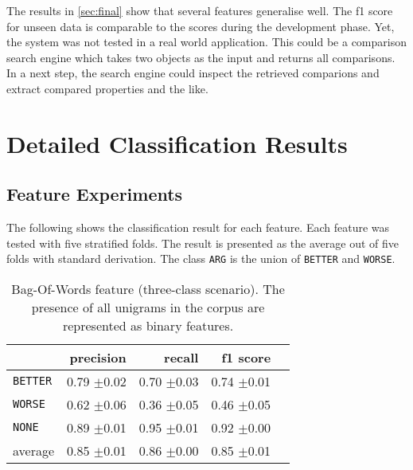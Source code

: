 The results in \ref{sec:final} show that several features generalise well. The f1 score for unseen data is comparable to the scores during the development phase. Yet, the system was not tested in a real world application. This could be a comparison search engine which takes two objects as the input and returns all comparisons. In a next step, the search engine could inspect the retrieved comparions and extract compared properties and the like.

\appendix

	\chapter{Detailed Classification Results}
\section{Feature Experiments}
	\setcounter{section}{1}
	The following shows the classification result for each feature. Each feature was tested with five stratified folds. The result is presented as the average out of five folds with standard derivation. The class \texttt{ARG} is the union of \texttt{BETTER} and \texttt{WORSE}.
	

	
	\begin{table}[h] 
		\centering 
		\caption{Bag-Of-Words feature (three-class scenario). The presence of all unigrams in the corpus are represented as binary features.} 
		\label{  }
		\begin{tabular}{@{}lrrrr@{}}
			\toprule
			        & precision                & recall                   & f1 score                 \\ \midrule 
			\texttt{BETTER}	&	 0.79 \scriptsize{$\pm$0.02} &	 0.70 \scriptsize{$\pm$0.03} &	 0.74 \scriptsize{$\pm$0.01}  \\ 
\texttt{WORSE}	&	 0.62 \scriptsize{$\pm$0.06} &	 0.36 \scriptsize{$\pm$0.05} &	 0.46 \scriptsize{$\pm$0.05}  \\ 
\texttt{NONE}	&	 0.89 \scriptsize{$\pm$0.01} &	 0.95 \scriptsize{$\pm$0.01} &	 0.92 \scriptsize{$\pm$0.00}  \\ 
average	&	 0.85 \scriptsize{$\pm$0.01} &	 0.86 \scriptsize{$\pm$0.00} &	 0.85 \scriptsize{$\pm$0.01}  \\ 			\bottomrule
		\end{tabular}
	\end{table}
	
